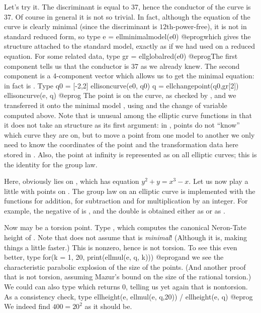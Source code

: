   Let's try it. The discriminant  is equal to 37, hence
the conductor of the curve is 37. Of course in general it is not so
trivial. In fact, although the equation of the curve is clearly
minimal (since the discriminant is $12$th-power-free), it is not in
standard reduced form, so type
\bprog
  e = ellminimalmodel(e0)
@eprog\noindent which
gives the  structure attached to the standard model,
exactly as if we had used  on a reduced equation. For
some related data, type
\bprog
  gr = ellglobalred(e0)
@eprog\noindent The first
component  tells us that the conductor is 37 as we already
knew.  The second component is a 4-component vector which allows us to
get the minimal equation: in fact  is .
Type
\bprog
  q0 = [-2,2]
  ellisoncurve(e0, q0)
  q = ellchangepoint(q0,gr[2])
  ellisoncurve(e, q)
@eprog\noindent
The point  is on the curve, as checked by , and we
transferred it onto the minimal model , using  and
the change of variable computed above. Note that  is
unusual among the elliptic curve functions in that it does not take an
 structure as its first argument: in , points do not
``know'' which curve they are on, but to move a point from one model to
another we only need to know the coordinates of the point and the
transformation data here stored in .  Also, the point at infinity
is represented as \kbd{[0]} on all elliptic curves; this is the identity for
the group law.

Here,  obviously lies on , which has equation
$y^2+y = x^3-x$.  Let us now play a little with points on .
The group law on an elliptic curve is implemented with the functions
 for addition,  for subtraction and
 for multiplication by an integer.  For
example, the negative of  is , and the
double is obtained either as  or as
.

Now  may be a torsion point. Type , which
computes the canonical Neron-Tate height of . Note that
 does not assume that  is \emph{minimal}! (Although
it is, making things a little faster.)
This is nonzero, hence  is not torsion. To see this even better,
type
\bprog
  for(k = 1, 20, print(ellmul(e, q, k)))
@eprog\noindent and we see the characteristic parabolic explosion of the size
of the points. (And another proof that  is not torsion, assuming
Mazur's bound on the size of the rational torsion.) We could can also type
 which returns 0, telling us yet again that  is
nontorsion. As a consistency check, type
\bprog
  ellheight(e, ellmul(e, q,20)) / ellheight(e, q)
@eprog\noindent
We indeed find $400=20^2$ as it should be.

